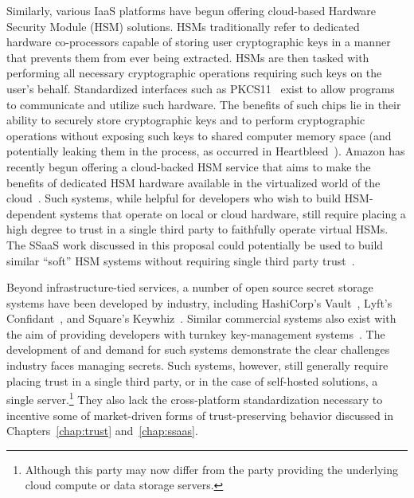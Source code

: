 Similarly, various IaaS platforms have begun offering cloud-based
Hardware Security Module (HSM) solutions. HSMs traditionally refer to
dedicated hardware co-processors capable of storing user cryptographic
keys in a manner that prevents them from ever being extracted. HSMs
are then tasked with performing all necessary cryptographic operations
requiring such keys on the user's behalf. Standardized interfaces such
as PKCS11~\cite{pcks11-standard} exist to allow programs to
communicate and utilize such hardware. The benefits of such chips lie
in their ability to securely store cryptographic keys and to perform
cryptographic operations without exposing such keys to shared computer
memory space (and potentially leaking them in the process, as occurred
in Heartbleed~\cite{heartbleed}). Amazon has recently begun offering a
cloud-backed HSM service that aims to make the benefits of dedicated
HSM hardware available in the virtualized world of the
cloud~\cite{amazon-hsm}. Such systems, while helpful for developers
who wish to build HSM-dependent systems that operate on local or cloud
hardware, still require placing a high degree to trust in a single
third party to faithfully operate virtual HSMs. The SSaaS work
discussed in this proposal could potentially be used to build similar
``soft'' HSM systems without requiring single third party
trust~\cite{lorier-pkcs11}.

Beyond infrastructure-tied services, a number of open source secret
storage systems have been developed by industry, including HashiCorp's
Vault~\cite{vault}, Lyft's Confidant~\cite{confidant}, and Square's
Keywhiz~\cite{keywhiz}. Similar commercial systems also exist with the
aim of providing developers with turnkey key-management
systems~\cite{gazzang, porticor, rosen2012}. The development of and
demand for such systems demonstrate the clear challenges industry
faces managing secrets. Such systems, however, still generally require
placing trust in a single third party, or in the case of self-hosted
solutions, a single server.\footnote{Although this party may now
  differ from the party providing the underlying cloud compute or data
  storage servers.} They also lack the cross-platform standardization
necessary to incentive some of market-driven forms of trust-preserving
behavior discussed in Chapters~\ref{chap:trust} and~\ref{chap:ssaas}.

